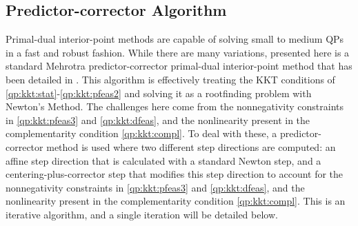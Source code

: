 \subsection{Predictor-corrector Algorithm}
Primal-dual interior-point methods are capable of solving small to medium QPs in a fast and robust fashion. While there are many variations, presented here is a standard Mehrotra predictor-corrector primal-dual interior-point method that has been detailed in \cite{mehrotra1992,vandenberghe,domahidi2013a,nesterov1997,andersen2003,nesterov1998,mattingley2012}. This algorithm is effectively treating the KKT conditions of \eqref{qp:kkt:stat}-\eqref{qp:kkt:pfeas2} and solving it as a rootfinding problem with Newton's Method. The challenges here come from the nonnegativity constraints in \eqref{qp:kkt:pfeas3} and \eqref{qp:kkt:dfeas}, and the nonlinearity present in the complementarity condition \eqref{qp:kkt:compl}. To deal with these, a predictor-corrector method is used where two different step directions are computed: an affine step direction that is calculated with a standard Newton step, and a centering-plus-corrector step that modifies this step direction to account for the nonnegativity constraints in \eqref{qp:kkt:pfeas3} and \eqref{qp:kkt:dfeas}, and the nonlinearity present in the complementarity condition \eqref{qp:kkt:compl}. This is an iterative algorithm, and a single iteration will be detailed below.
%
